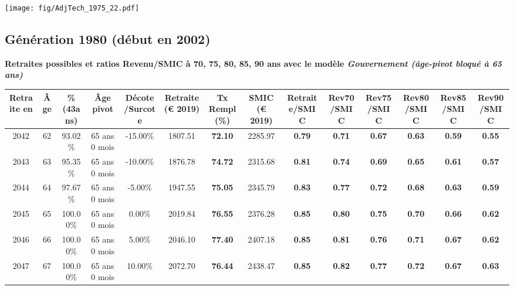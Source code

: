  \vspace{0.1cm} 

 \begin{center}\texttt{[image: fig/AdjTech\_1975\_22.pdf]}\end{center} \label{fig/AdjTech_1975_22.pdf} 

\newpage 
 
\subsection{Génération 1980 (début en 2002)} 

{\bf \noindent Retraites possibles et ratios Revenu/SMIC à 70, 75, 80, 85, 90 ans avec le modèle \emph{Gouvernement (âge-pivot bloqué à 65 ans)}}  
 
\begin{adjustbox}{max width=\textwidth} 
\begin{tabular}[htb]{|c|c||c|c|c||c|c||c||c|c|c|c|c|c|} 
\hline 
 Retraite en &  Âge &  \%(43ans) &  Âge pivot &  Décote/Surcote &  Retraite (\euro{} 2019) &  Tx Rempl(\%) &  SMIC (\euro{} 2019) &  Retraite/SMIC &  Rev70/SMIC &  Rev75/SMIC &  Rev80/SMIC &  Rev85/SMIC &  Rev90/SMIC \\ 
\hline \hline 
 2042 &  62 &  93.02\% &  65 ans 0 mois &  -15.00\% &  1807.51 &  {\bf 72.10} &  2285.97 &  {\bf {\color{red} 0.79}} &  {\bf {\color{red} 0.71}} &  {\bf {\color{red} 0.67}} &  {\bf {\color{red} 0.63}} &  {\bf {\color{red} 0.59}} &  {\bf {\color{red} 0.55}} \\ 
\hline 
 2043 &  63 &  95.35\% &  65 ans 0 mois &  -10.00\% &  1876.78 &  {\bf 74.72} &  2315.68 &  {\bf {\color{red} 0.81}} &  {\bf {\color{red} 0.74}} &  {\bf {\color{red} 0.69}} &  {\bf {\color{red} 0.65}} &  {\bf {\color{red} 0.61}} &  {\bf {\color{red} 0.57}} \\ 
\hline 
 2044 &  64 &  97.67\% &  65 ans 0 mois &  -5.00\% &  1947.55 &  {\bf 75.05} &  2345.79 &  {\bf {\color{red} 0.83}} &  {\bf {\color{red} 0.77}} &  {\bf {\color{red} 0.72}} &  {\bf {\color{red} 0.68}} &  {\bf {\color{red} 0.63}} &  {\bf {\color{red} 0.59}} \\ 
\hline 
 2045 &  65 &  100.00\% &  65 ans 0 mois &  0.00\% &  2019.84 &  {\bf 76.55} &  2376.28 &  {\bf {\color{red} 0.85}} &  {\bf {\color{red} 0.80}} &  {\bf {\color{red} 0.75}} &  {\bf {\color{red} 0.70}} &  {\bf {\color{red} 0.66}} &  {\bf {\color{red} 0.62}} \\ 
\hline 
 2046 &  66 &  100.00\% &  65 ans 0 mois &  5.00\% &  2046.10 &  {\bf 77.40} &  2407.18 &  {\bf {\color{red} 0.85}} &  {\bf {\color{red} 0.81}} &  {\bf {\color{red} 0.76}} &  {\bf {\color{red} 0.71}} &  {\bf {\color{red} 0.67}} &  {\bf {\color{red} 0.62}} \\ 
\hline 
 2047 &  67 &  100.00\% &  65 ans 0 mois &  10.00\% &  2072.70 &  {\bf 76.44} &  2438.47 &  {\bf {\color{red} 0.85}} &  {\bf {\color{red} 0.82}} &  {\bf {\color{red} 0.77}} &  {\bf {\color{red} 0.72}} &  {\bf {\color{red} 0.67}} &  {\bf {\color{red} 0.63}} \\ 
\hline 
\hline 
\end{tabular} 
\end{adjustbox} 
 
